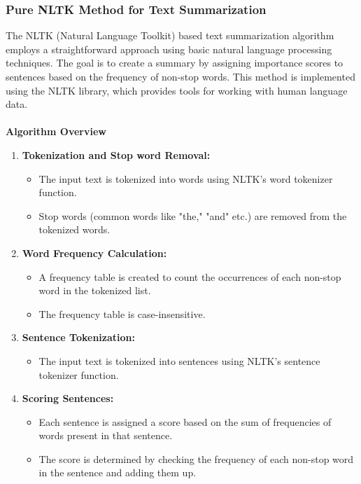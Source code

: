 \documentclass{ieeeaccess}
\begin{document}
\subsubsection{Pure NLTK Method for Text Summarization}
The NLTK (Natural Language Toolkit) based text summarization algorithm employs a straightforward approach using basic natural language processing techniques. The goal is to create a summary by assigning importance scores to sentences based on the frequency of non-stop words. This method is implemented using the NLTK library, which provides tools for working with human language data.\\\\
\textbf{Algorithm Overview}
\begin{enumerate}
    \item \textbf{Tokenization and Stop word Removal:}
    \begin{itemize}
        \item The input text is tokenized into words using NLTK's word tokenizer function.
        \item Stop words (common words like "the," "and" etc.) are removed from the tokenized words.
    \end{itemize}
    
    \item \textbf{Word Frequency Calculation:}
    \begin{itemize}
        \item A frequency table is created to count the occurrences of each non-stop word in the tokenized list.
        \item The frequency table is case-insensitive.
    \end{itemize}
    
    \item \textbf{Sentence Tokenization:}
    \begin{itemize}
        \item The input text is tokenized into sentences using NLTK's sentence tokenizer function.
    \end{itemize}
    
    \item \textbf{Scoring Sentences:}
    \begin{itemize}
        \item Each sentence is assigned a score based on the sum of frequencies of words present in that sentence.
        \item The score is determined by checking the frequency of each non-stop word in the sentence and adding them up.
    \end{itemize}
    

\end{enumerate}
\end{document}
